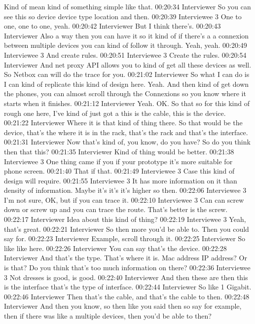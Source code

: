 Kind of mean kind of something simple like that.
00:20:34 Interviewer
So you can see this so device device type location and then.
00:20:39 Interviewee 3
One to one, one to one, yeah.
00:20:42 Interviewer
But I think there's.
00:20:43 Interviewer
Also a way then you can have it so it kind of if there's a a connexion between multiple devices you can kind of follow it through. Yeah, yeah.
00:20:49 Interviewee 3
And create rules.
00:20:51 Interviewee 3
Create the rules.
00:20:54 Interviewer
And net proxy API allows you to kind of get all these devices as well. So Netbox can will do the trace for you.
00:21:02 Interviewer
So what I can do is I can kind of replicate this kind of design here. Yeah. And then kind of get down the phones, you can almost scroll through the Connexions so you know where it starts when it finishes.
00:21:12 Interviewer
Yeah. OK. So that so for this kind of rough one here, I've kind of just got a this is the cable, this is the device.
00:21:22 Interviewer
Where it is that kind of thing there. So that would be the device, that's the where it is in the rack, that's the rack and that's the interface.
00:21:31 Interviewer
Now that's kind of, you know, do you have? So do you think then that this?
00:21:35 Interviewer
Kind of thing would be better.
00:21:38 Interviewee 3
One thing came if you if your prototype it's more suitable for phone screen.
00:21:40
That if that.
00:21:49 Interviewee 3
Case this kind of design will require.
00:21:55 Interviewee 3
It has more information on it than density of information. Maybe it's it's it's higher so then.
00:22:06 Interviewee 3
I'm not sure, OK, but if you can trace it.
00:22:10 Interviewee 3
Can can screw down or screw up and you can trace the route. That's better is the screw.
00:22:17 Interviewer
Idea about this kind of thing?
00:22:19 Interviewee 3
Yeah, that's great.
00:22:21 Interviewer
So then more you'd be able to. Then you could say for.
00:22:23 Interviewer
Example, scroll through it.
00:22:25 Interviewer
So like like here.
00:22:26 Interviewer
You can say that's the device.
00:22:28 Interviewer
And that's the type. That's where it is. Mac address IP address? Or is that? Do you think that's too much information on there?
00:22:36 Interviewee 3
Not dresses is good, is good.
00:22:40 Interviewer
And then these are then this is the interface that's the type of interface.
00:22:44 Interviewer
So like 1 Gigabit.
00:22:46 Interviewer
Then that's the cable, and that's the cable to then.
00:22:48 Interviewer
And then you know, so then like you said then so say for example, then if there was like a multiple devices, then you'd be able to then?
